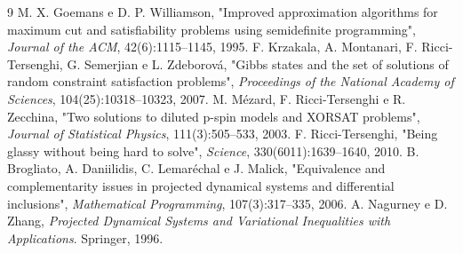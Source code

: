 \documentclass[11pt,a4paper]{article}
\begin{document}
\begin{thebibliography}{9}
 M. X. Goemans e D. P. Williamson, "Improved approximation algorithms for maximum cut and satisfiability problems using semidefinite programming", \emph{Journal of the ACM}, 42(6):1115--1145, 1995.
 F. Krzakala, A. Montanari, F. Ricci-Tersenghi, G. Semerjian e L. Zdeborov\'a, "Gibbs states and the set of solutions of random constraint satisfaction problems", \emph{Proceedings of the National Academy of Sciences}, 104(25):10318--10323, 2007.
 M. M\'ezard, F. Ricci-Tersenghi e R. Zecchina, "Two solutions to diluted p-spin models and XORSAT problems", \emph{Journal of Statistical Physics}, 111(3):505--533, 2003.
 F. Ricci-Tersenghi, "Being glassy without being hard to solve", \emph{Science}, 330(6011):1639--1640, 2010.
 B. Brogliato, A. Daniilidis, C. Lemar\'echal e J. Malick, "Equivalence and complementarity issues in projected dynamical systems and differential inclusions", \emph{Mathematical Programming}, 107(3):317--335, 2006.
 A. Nagurney e D. Zhang, \emph{Projected Dynamical Systems and Variational Inequalities with Applications}. Springer, 1996.
\end{thebibliography}
\end{document}
